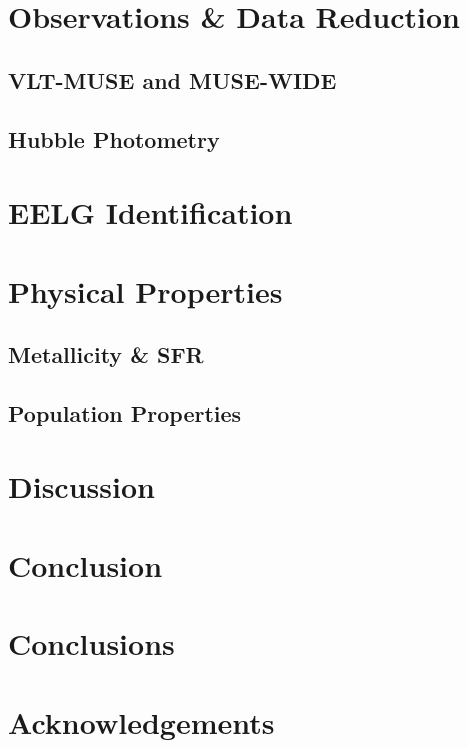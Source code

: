 \documentclass[fleqn,usenatbib]{mnras}
\begin{document}
\section{Observations \& Data Reduction}
\label{sec:obs}
\subsection{VLT-MUSE and MUSE-WIDE}
\subsection{Hubble Photometry}
\section{EELG Identification}
\label{sec:pop}
\section{Physical Properties}
\label{sec:ast}
\subsection{Metallicity \& SFR}
\subsection{Population Properties}
\section{Discussion}
\label{sec:dis}
\section{Conclusion}
\label{sec:conc}




\section{Conclusions}


\section*{Acknowledgements}

\end{document}
